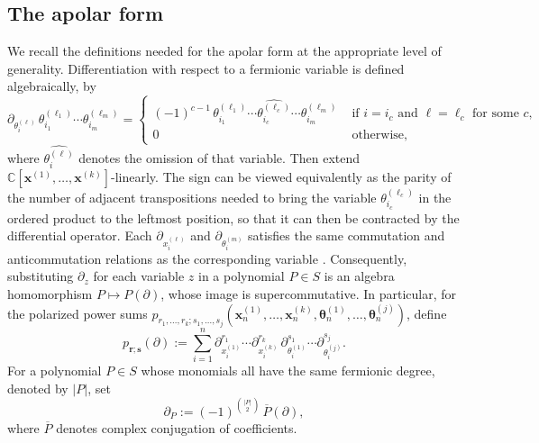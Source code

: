 \documentclass[12pt]{amsart}
\theoremstyle{plain}
\theoremstyle{definition}
\newcommand{\C}{\mathbb{C}}
\begin{document}
\subsection{The apolar form}
We recall the definitions needed for the apolar form at the appropriate level of generality.
Differentiation with respect to a fermionic variable is defined algebraically, by
\begin{equation}\label{eq:interior-product}
    \partial_{\theta_i^{(\ell)}}\, \theta_{i_1}^{(\ell_1)} \cdots \theta_{i_m}^{(\ell_m)}
    = \begin{cases}
        (-1)^{c - 1}\, \theta_{i_1}^{(\ell_1)} \cdots \widehat{\theta_{i_c}^{(\ell_c)}} \cdots \theta_{i_m}^{(\ell_m)}
            & \text{ if $i = i_c$ and $\ell = \ell_c$ for some $c$,}\\
        0 & \text{ otherwise,}
    \end{cases}
\end{equation}
where $\widehat{\theta_{i}^{(\ell)}} $ denotes the omission of that variable.
Then extend $\C[\bm{x}^{(1)}, \ldots, \bm{x}^{(k)}]$-linearly.
The sign can be viewed equivalently as the parity of the number of adjacent transpositions needed to bring the variable $\theta_{i_c}^{(\ell_c)}$ in the ordered product to the leftmost position, so that it can then be contracted by the differential operator.
Each $\partial_{x_i^{(\ell)}}$ and $\partial_{\theta_i^{(m)}}$ satisfies the same commutation and anticommutation relations as the corresponding variable \cite[Lemma 4.2]{SwansonPreprint}.
Consequently, substituting $\partial_z$ for each variable $z$ in a polynomial $P \in S$ is an algebra homomorphism $P \mapsto P(\partial)$, whose image is supercommutative.
In particular, for the polarized power sums $p_{r_1,\ldots,r_k;s_1,\ldots,s_j}(\bm{x}^{(1)}_n, \ldots, \bm{x}^{(k)}_n, \bm{\theta}_n^{(1)}, \ldots, \bm{\theta}_n^{(j)})$, define 
\begin{equation}\label{eq:pps-operator}
        p_{\bm{r};\bm{s}}(\partial)
    := \sum_{i=1}^n \partial_{x_i^{(1)}}^{r_1} \cdots \partial_{x_i^{(k)}}^{r_k}\,
        \partial_{\theta_i^{(1)}}^{s_1} \cdots \partial_{\theta_i^{(j)}}^{s_j}.
\end{equation}
For a polynomial $P \in S$ whose monomials all have the same fermionic degree, denoted by $|P|$, set
\begin{equation}\label{eq:twisted-op}
    \partial_P := (-1)^{\binom{|P|}{2}}\, \overline{P}(\partial),
\end{equation}
where $\overline{P}$ denotes complex conjugation of coefficients. 
\end{document}
